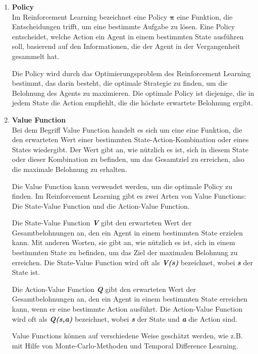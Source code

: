 \begin{enumerate}
    \item \textbf{Policy}\\
    Im Reinforcement Learning bezeichnet eine Policy {$\bm{\pi}$} \cite{mediumReinforcementLearningPolicyValue} eine Funktion, die Entscheidungen trifft, um eine bestimmte Aufgabe zu lösen. Eine Policy entscheidet, welche Action ein Agent in einem bestimmten State ausführen soll, basierend auf den Informationen, die der Agent in der Vergangenheit gesammelt hat.

    Die Policy wird durch das Optimierungsproblem des Reinforcement Learning bestimmt, das darin besteht, die optimale Strategie zu finden, um die Belohnung des Agents zu maximieren. Die optimale Policy ist diejenige, die in jedem State die Action empfiehlt, die die höchste erwartete Belohnung ergibt.
    
    \item \textbf{Value Function}\\
    Bei dem Begriff Value Function \cite{mediumReinforcementLearningPolicyValue} handelt es sich um eine eine Funktion, die den erwarteten Wert einer bestimmten State-Action-Kombination oder eines States wiedergibt. Der Wert gibt an, wie nützlich es ist, sich in diesem State oder dieser Kombination zu befinden, um das Gesamtziel zu erreichen, also die maximale Belohnung zu erhalten.

    Die Value Function kann verwendet werden, um die optimale Policy zu finden. Im Reinforcement Learning gibt es zwei Arten von Value Functions: Die State-Value Function und die Action-Value Function.
    
    Die State-Value Function \textbf{\textit{V}} gibt den erwarteten Wert der Gesamtbelohnungen an, den ein Agent in einem bestimmten State erzielen kann. Mit anderen Worten, sie gibt an, wie nützlich es ist, sich in einem bestimmten State zu befinden, um das Ziel der maximalen Belohnung zu erreichen. Die State-Value Function wird oft als \textbf{\textit{V(s)}} bezeichnet, wobei \textbf{\textit{s}} der State ist.
    
    Die Action-Value Function \textbf{\textit{Q}} gibt den erwarteten Wert der Gesamtbelohnungen an, den ein Agent in einem bestimmten State erreichen kann, wenn er eine bestimmte Action ausführt. Die Action-Value Function wird oft als \textbf{\textit{Q(s,a)}} bezeichnet, wobei \textbf{\textit{s}} der State und \textbf{\textit{a}} die Action sind.
    
    Value Functions können auf verschiedene Weise geschätzt werden, wie z.B. mit Hilfe von Monte-Carlo-Methoden und Temporal Difference Learning.


\end{enumerate}
